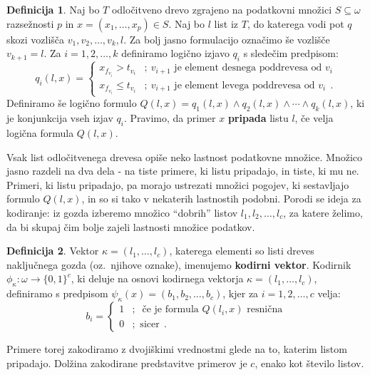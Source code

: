 \documentclass[12pt,a4paper,twoside]{article}
\theoremstyle{definition} %
\newtheorem{definicija}{Definicija}[section]
\theoremstyle{plain} %
\numberwithin{equation}{section}  %
\begin{document}
\begin{definicija}
\label{def-pripadnost-listu}
Naj bo $T$ odločitveno drevo zgrajeno na podatkovni množici $S \subseteq \omega$ razsežnosti $p$ in $x=(x_1,\ldots,x_p) \in S$. 
Naj bo $l$ list iz $T$, do katerega vodi pot $q$ skozi vozlišča $v_1, v_2, \ldots, v_k, l$. 
Za bolj jasno formulacijo označimo še vozlišče $v_{k+1} = l$.
Za $i=1,2,\ldots,k$ definiramo logično izjavo $q_i$ s sledečim predpisom:
\[
q_i(l,x) =
\begin{cases}
x_{f_{v_i}} > t_{v_i} &;\ v_{i+1} \text{ je element desnega poddrevesa od } v_i \\
x_{f_{v_i}} \leq t_{v_i} &;\ v_{i+1} \text{ je element levega poddrevesa od } v_i\ \ .
\end{cases}
\]
Definiramo še logično formulo $Q(l,x)=q_1(l,x) \land q_2(l,x) \land \cdots \land q_k(l,x)$, ki je konjunkcija vseh izjav $q_i$.
Pravimo, da primer $x$ \textbf{pripada} listu $l$, če velja logična formula $Q(l,x)$.
\end{definicija}

Vsak list odločitvenega drevesa opiše neko lastnost podatkovne množice. Množico jasno razdeli na dva dela - na tiste primere, ki listu pripadajo, in tiste, ki mu ne.
Primeri, ki listu pripadajo, pa morajo ustrezati množici pogojev, ki sestavljajo formulo $Q(l,x)$, in so si tako v nekaterih lastnostih podobni. %
Porodi se ideja za kodiranje: iz gozda izberemo množico ``dobrih'' listov $l_1, l_2, \ldots, l_c$, za katere želimo, da bi skupaj čim bolje zajeli lastnosti množice podatkov.

\begin{definicija}
\label{def-kodiranje}
	Vektor $\kappa=(l_1,\ldots,l_c)$, katerega elementi so listi dreves naključnega gozda (oz.~njihove oznake), imenujemo \textbf{kodirni vektor}.
	Kodirnik $\phi_\kappa: \omega \rightarrow \{0,1\}^c$, ki deluje na osnovi kodirnega vektorja $\kappa=(l_1,\ldots, l_c)$, definiramo s predpisom $\psi_\kappa(x) = (b_1, b_2, \ldots, b_c)$, kjer za $i=1,2,\ldots,c$ velja:
	$$
	b_i = 
	\begin{cases}
	1 &;\ \text{ če je formula } Q(l_i,x) \text{ resnična} \\
	0 &; \text{ sicer}\ \ .
	\end{cases}
	$$
\end{definicija}
Primere torej zakodiramo z dvojiškimi vrednostmi glede na to, katerim listom pripadajo. Dolžina zakodirane predstavitve primerov je $c$, enako kot število listov.
\end{document}
